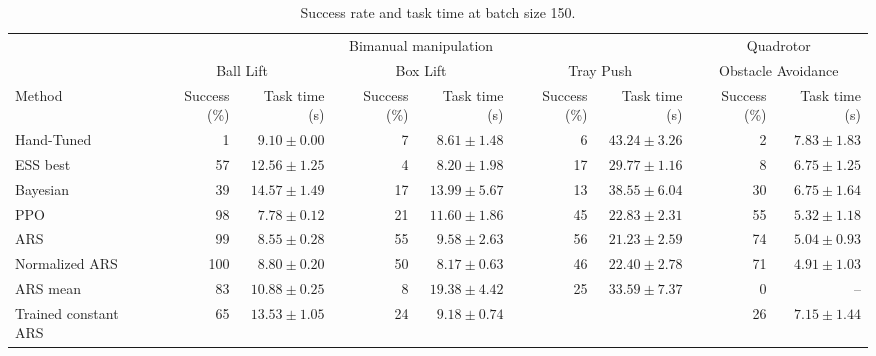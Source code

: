 \begin{table}[t]
\centering\footnotesize
\setlength{\tabcolsep}{2pt}
\caption{Success rate and task time at batch size 150. }
\label{tab:benchmark-b150}
\begin{tabular}{@{}l*{4}{rr}@{}}
 & \multicolumn{6}{c}{Bimanual manipulation} & \multicolumn{2}{c}{Quadrotor} \\
\cline{2-7}\cline{8-9}
 & \multicolumn{2}{c}{Ball Lift} & \multicolumn{2}{c}{Box Lift} & \multicolumn{2}{c}{Tray Push} & \multicolumn{2}{c}{Obstacle Avoidance} \\
Method & Success (\%) & Task time (s) & Success (\%) & Task time (s) & Success (\%) & Task time (s) & Success (\%) & Task time (s) \\
\hline
Hand-Tuned & 1 & $ 9.10 \pm 0.00 $ & 7 & $ 8.61 \pm 1.48 $ & 6 & $ 43.24 \pm 3.26 $ & 2 & $7.83 \pm 1.83$ \\
ESS best & 57 & $ 12.56 \pm 1.25 $ & 4 & $ 8.20 \pm 1.98 $ & 17 & $ 29.77 \pm 1.16 $ & 8 & $6.75 \pm 1.25$ \\
Bayesian & 39 & $ 14.57 \pm 1.49 $ & 17 & $ 13.99 \pm 5.67 $ & 13 & $ 38.55 \pm 6.04 $ & 30 & $6.75 \pm 1.64$ \\
PPO & 98 & $ 7.78 \pm 0.12 $ & 21 & $ 11.60 \pm 1.86 $ & 45 & $ 22.83 \pm 2.31 $ & 55 & $5.32 \pm 1.18$ \\
ARS & 99 & $ 8.55 \pm 0.28 $ & 55 & $ 9.58 \pm 2.63 $ & 56 & $ 21.23 \pm 2.59 $ & 74 & $5.04 \pm 0.93$ \\
Normalized ARS & 100 & $ 8.80 \pm 0.20 $ & 50 & $ 8.17 \pm 0.63 $ & 46 & $ 22.40 \pm 2.78 $ & 71 & $4.91 \pm 1.03$ \\
ARS mean & 83 & $ 10.88 \pm 0.25 $ & 8 & $ 19.38 \pm 4.42 $ & 25 & $ 33.59 \pm 7.37 $ & 0 & -- \\
Trained constant ARS & 65 & $ 13.53 \pm 1.05 $ & 24 & $ 9.18 \pm 0.74 $ &  &  & 26 & $7.15 \pm 1.44$ \\
\hline
\end{tabular}
\end{table}
